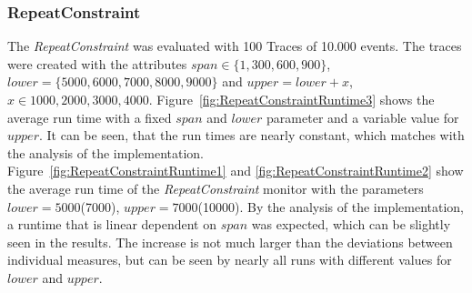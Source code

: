 \subsubsection{RepeatConstraint}
	The \textit{RepeatConstraint} was evaluated with 100 Traces of 10.000 events. The traces were created with the attributes $span\in\{1,300,600,900\}$, $lower=\{5000,6000,7000,8000,9000\}$ and $upper=lower+x$, $x\in{1000,2000,3000,4000}$.  Figure~\ref{fig:RepeatConstraintRuntime3} shows the average run time with a fixed $span$ and $lower$ parameter and a variable value for $upper$. It can be seen, that the run times are nearly constant, which matches with the analysis of the implementation.\\ Figure~\ref{fig:RepeatConstraintRuntime1} and \ref{fig:RepeatConstraintRuntime2} show the average run time of the \textit{RepeatConstraint} monitor with the parameters $lower=5000$(7000), $upper=7000$(10000). By the analysis of the implementation, a runtime that is linear dependent on $span$ was expected, which can be slightly seen in the results. The increase is not much larger than the deviations between individual measures, but can be seen by nearly all runs with different values for $lower$ and $upper$. 

